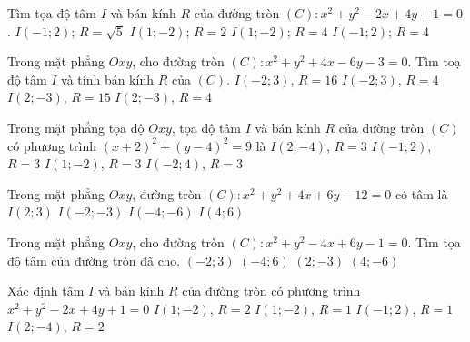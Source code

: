 \begin{ex}%
	Tìm tọa độ tâm  $I$ và bán kính $R$ của đường tròn $(C)\colon x^2+y^2-2x+4y+1=0$.
	 \choice
		{$I(-1;2)$; $R=\sqrt{5}$} 
		{\True $I(1;-2)$; $R=2$} 
		{$I(1;-2)$;  $R=4$}
		 {$I(-1;2)$; $R=4$}
\end{ex}

\begin{ex}%
	Trong mặt phẳng $Oxy$, cho đường tròn $(C)\colon x^2+y^2+4x-6y-3=0$. Tìm toạ độ tâm $I$ và tính bán  kính $R$ của $(C)$.
	\choice 
		{$I(-2;3)$, $R=16$} 
		 {\True $I(-2;3)$, $R=4$}
		 {$I(2;-3)$, $R=15$}
		{$I(2;-3)$, $R=4$} 
\end{ex}

\begin{ex}%
	Trong mặt  phẳng tọa độ $Oxy$, tọa độ tâm $I$ và bán kính $R$ của đường tròn $(C)$ có phương trình $(x+2)^2+(y-4)^2=9$ là
	\choice 
		 {$I(2;-4)$, $R=3$}
		{$I(-1;2)$, $R=3$} 
		 {$I(1;-2)$, $R=3$}
		{\True  $I(-2;4)$, $R=3$}
\end{ex}

\begin{ex}%
	Trong mặt phẳng $Oxy$, đường tròn $(C)\colon  x^2+y^2+4x+6y-12=0$ có tâm là
	\choice 
		{$I(2;3)$} 
		{\True  $I(-2;-3)$}
		 {$I(-4;-6)$}
		 {$I(4;6)$}
\end{ex}

\begin{ex}%
	Trong mặt phẳng $Oxy$, cho đường tròn $(C)\colon x^2+y^2-4x+6y-1=0$. Tìm tọa độ tâm của đường tròn đã cho. 
	 \choice
		{$(-2; 3)$} 
		{$(-4; 6)$} 
		 {\True $(2;-3)$}
		{$(4;-6)$} 
\end{ex}

\begin{ex}%
	Xác định tâm $I$ và bán kính $R$ của đường tròn có phương  trình $x^2+y^2-2 x+4 y+1=0$
	 \choice
		{\True $I(1;-2)$, $R =2$} 
		{$I(1;-2)$, $R =1$} 
		{$I(-1; 2)$, $R=1$} 
		{$I(2;-4)$, $R =2$} 
\end{ex}

